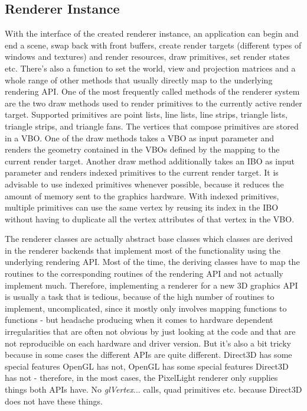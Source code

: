 \subsection{Renderer Instance}
With the interface of the created renderer instance, an application can begin and end a scene, swap back with front buffers, create render targets (different types of windows and textures) and render resources, draw primitives, set render states etc. There's also a function to set the world, view and projection matrices and a whole range of other methods that usually directly map to the underlying rendering \ac{API}. One of the most frequently called methods of the renderer system are the two draw methods used to render primitives to the currently active render target. Supported primitives are point lists, line lists, line strips, triangle lists, triangle strips, and triangle fans. The vertices that compose primitives are stored in a \ac{VBO}. One of the draw methods takes a \ac{VBO} as input parameter and renders the geometry contained in the \ac{VBO}s defined by the mapping to the current render target. Another draw method additionally takes an \ac{IBO} as input parameter and renders indexed primitives to the current render target. It is advisable to use indexed primitives whenever possible, because it reduces the amount of memory sent to the graphics hardware. With indexed primitives, multiple primitives can use the same vertex by reusing its index in the \ac{IBO} without having to duplicate all the vertex attributes of that vertex in the \ac{VBO}.

The renderer classes are actually abstract base classes which classes are derived in the renderer backends that implement most of the functionality using the underlying rendering \ac{API}. Most of the time, the deriving classes have to map the routines to the corresponding routines of the rendering \ac{API} and not actually implement much. Therefore, implementing a renderer for a new 3D graphics \ac{API} is usually a task that is tedious, because of the high number of routines to implement, uncomplicated, since it mostly only involves mapping functions to functions - but headache producing when it comes to hardware dependent irregularities that are often not obvious by just looking at the code and that are not reproducible on each hardware and driver version. But it's also a bit tricky because in some cases the different \ac{API}s are quite different. Direct3D has some special features OpenGL has not, OpenGL has some special features Direct3D has not - therefore, in the most cases, the PixelLight renderer only supplies things both \ac{API}s have. No \emph{glVertex}... calls, quad primitives etc. because Direct3D does not have these things.




